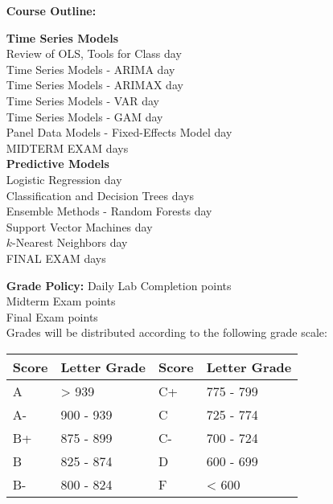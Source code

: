 \documentclass[12pt, margin=.5in]{article}
\begin{document}
\begin{itemize}
\vspace*{.15in}
\item[\textbf{Course Outline:}]

\textbf{Time Series Models}\hfill \\[1.8em]
Review of OLS, Tools for Class  day\\
Time Series Models - ARIMA  day\\
Time Series Models - ARIMAX  day\\
Time Series Models - VAR  day\\
Time Series Models - GAM  day\\
Panel Data Models - Fixed-Effects Model  day\\
MIDTERM EXAM  days\\[1.8em]
\textbf{Predictive Models}\hfill \\[1.8em]
Logistic Regression  day\\
Classification and  Decision Trees  days\\
Ensemble Methods - Random Forests  day\\
Support Vector Machines  day\\
$k$-Nearest Neighbors  day\\
FINAL EXAM  days\\



\vspace*{.15in}
\item[\textbf{Grade Policy:}] 
Daily Lab Completion  points\\
Midterm Exam  points \\
Final Exam  points \\

\vspace*{1em}
Grades will be distributed according to the following grade scale: \\

\begin{tabular}{l|l|l|l}
Score & Letter Grade & Score & Letter Grade\\
\hline
A & > 939 & C+ & 775 - 799 \\
A- & 900 - 939 & C & 725 - 774 \\
B+ & 875 - 899 & C- & 700 - 724 \\
B & 825 - 874 & D & 600 - 699 \\
B- & 800 - 824 & F & < 600 \\
\end{tabular}



\end{itemize}
\end{document}
